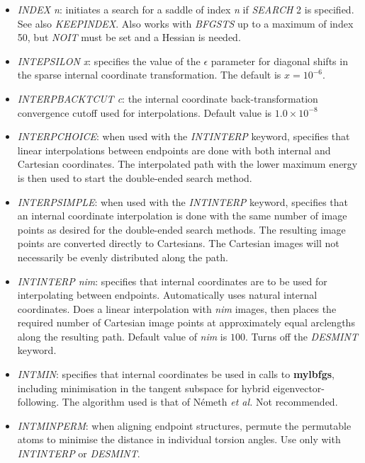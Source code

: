 \documentclass[12pt,a4paper,dvips]{article}
\begin{document}
\begin{itemize}
\item {\it INDEX n\/}: initiates a search for a saddle of index {\it n\/} if
      {\it SEARCH\/} 2 is specified. See also {\it KEEPINDEX\/}. Also works with {\it BFGSTS\/}
      up to a maximum of index 50, but {\it NOIT\/} must be set and a Hessian is needed.

\item {\it INTEPSILON x\/}: specifies the value of the $\epsilon$ parameter
for diagonal shifts in the sparse internal coordinate transformation.
The default is $x=10^{-6}$.

\item {\it INTERPBACKTCUT c\/}: the internal coordinate back-transformation
  convergence cutoff used for interpolations. Default
  value is $1.0\times10^{-8}$

\item {\it INTERPCHOICE\/}: when used with the {\it INTINTERP\/} keyword,
  specifies that linear interpolations between endpoints are done with both
  internal and Cartesian coordinates. The interpolated path with the lower
  maximum energy is then used to start the double-ended search method.

\item {\it INTERPSIMPLE\/}: when used with the {\it INTINTERP\/} keyword,
  specifies that an internal coordinate interpolation is done with the same
  number of image points as desired for the double-ended search methods. The
  resulting image points are converted directly to Cartesians. The Cartesian
  images will not necessarily be evenly distributed along the path.

\item {\it INTINTERP nim\/}: specifies that internal coordinates are to be
  used for interpolating between
  endpoints. Automatically uses natural internal coordinates. Does a linear
  interpolation with {\it nim\/} images, then places the required number of
  Cartesian image points at approximately equal arclengths along the resulting
  path. Default value of {\it nim\/} is $100$. Turns off the {\it DESMINT\/} keyword.

\item {\it INTMIN\/}: specifies that internal coordinates be used in calls to {\bf mylbfgs},
including minimisation in the tangent subspace for hybrid eigenvector-following.
The algorithm used is that of N\'emeth {\it et al.\/}\cite{NemethCMA00}
Not recommended.

\item {\it INTMINPERM\/}: when aligning endpoint structures, permute the
  permutable atoms to minimise the distance in individual torsion angles. Use
  only with {\it INTINTERP\/} or {\it DESMINT\/}.


\end{itemize}
\end{document}
